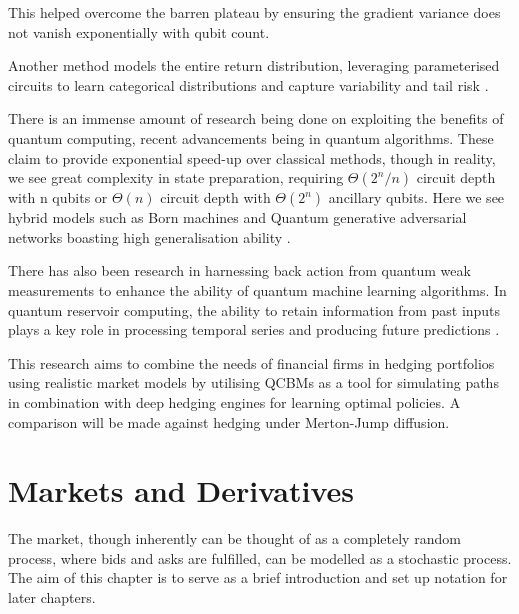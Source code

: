 \documentclass[12pt]{article}
\newcommand{\newp}
    {
    \vskip 0.5cm 
  }
\numberwithin{equation}{section}
\begin{document}
This helped overcome the barren 
plateau by ensuring the gradient 
variance does not vanish exponentially with qubit count. 
\newp
Another method models 
the entire return distribution, leveraging parameterised circuits to learn categorical 
distributions and capture variability and tail risk 
\autocite{cherrat_quantum_2023,dasgupta_loading_2022}.
\newp
There is an immense amount of research being done on exploiting the benefits of 
quantum computing, recent advancements being in quantum algorithms. 
These claim to provide exponential speed-up over classical 
methods, though in reality, we see great complexity in state preparation, requiring 
$\Theta(2^n/n)$ circuit depth with n qubits or $\Theta(n)$ circuit depth with 
$\Theta(2^n)$ ancillary qubits\autocite{zhang_quantum_2022}. Here we see hybrid 
models such as Born machines
and Quantum generative adversarial networks boasting high generalisation ability
\autocite{ganguly_implementing_nodate,gili_2022_do,horowitz_quantum_2022}.
\newp
There has also been research in harnessing back action from quantum weak 
measurements to enhance the ability of quantum machine learning algorithms. 
In quantum reservoir computing,
the ability to retain information from past inputs plays a key role in processing 
temporal series and producing future predictions
\autocite{franceschetto_harnessing_2024,fujii_quantum_2020,garcia-beni_squeezing_2024,mujal_time-series_2023}.
\newp
This research aims to combine the needs of financial firms in hedging portfolios
using realistic market models by utilising QCBMs as a tool 
for simulating paths in combination with deep hedging engines for learning 
optimal policies. A comparison will be made against hedging under Merton-Jump 
diffusion. 
\clearpage
\section{Markets and Derivatives}
The market, though inherently can be thought of as a completely random process,
where bids and asks are fulfilled, can be modelled as a stochastic process. The 
aim of this chapter is to serve as a brief introduction and set up notation for 
later chapters. \\
\end{document}
